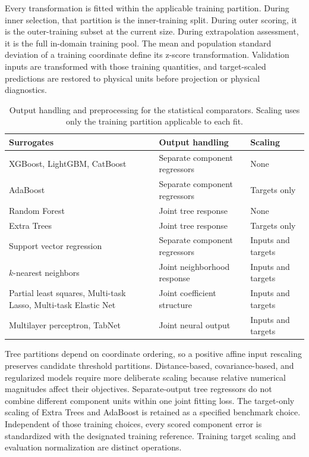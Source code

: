Every transformation is fitted within the applicable training partition. During inner selection, that partition is the inner-training split. During outer scoring, it is the outer-training subset at the current size. During extrapolation assessment, it is the full in-domain training pool. The mean and population standard deviation of a training coordinate define its z-score transformation. Validation inputs are transformed with those training quantities, and target-scaled predictions are restored to physical units before projection or physical diagnostics.

\begin{table}[htbp]
\centering
\caption{Output handling and preprocessing for the statistical comparators. Scaling uses only the training partition applicable to each fit.}
\label{tab:surrogate_preprocessing}
\small
\begin{tabular}{p{5.1cm}p{3.2cm}p{3.3cm}}
\toprule
Surrogates & Output handling & Scaling\\
\midrule
XGBoost, LightGBM, CatBoost & Separate component regressors & None\\
AdaBoost & Separate component regressors & Targets only\\
Random Forest & Joint tree response & None\\
Extra Trees & Joint tree response & Targets only\\
Support vector regression & Separate component regressors & Inputs and targets\\
$k$-nearest neighbors & Joint neighborhood response & Inputs and targets\\
Partial least squares, Multi-task Lasso, Multi-task Elastic Net & Joint coefficient structure & Inputs and targets\\
Multilayer perceptron, TabNet & Joint neural output & Inputs and targets\\
\bottomrule
\end{tabular}
\end{table}

Tree partitions depend on coordinate ordering, so a positive affine input rescaling preserves candidate threshold partitions. Distance-based, covariance-based, and regularized models require more deliberate scaling because relative numerical magnitudes affect their objectives. Separate-output tree regressors do not combine different component units within one joint fitting loss. The target-only scaling of Extra Trees and AdaBoost is retained as a specified benchmark choice. Independent of those training choices, every scored component error is standardized with the designated training reference. Training target scaling and evaluation normalization are distinct operations.

